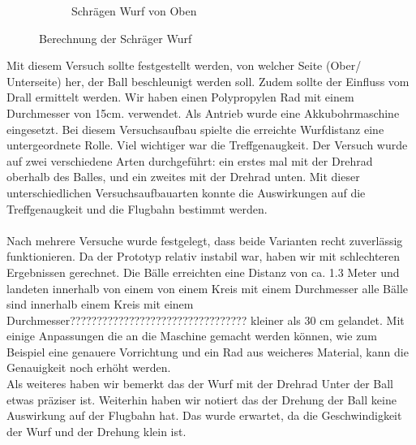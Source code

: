 \begin{figure}[h!]
\begin{subfigure}{.4\textwidth}
		\caption{Schrägen Wurf von Oben}
		\label{fig:Drehrad}
	\end{subfigure}
	\caption{Berechnung der Schräger Wurf}
	\label{Drehrad Versuch}
\end{figure}
Mit diesem Versuch sollte festgestellt werden, von welcher Seite (Ober/ Unterseite) her, der Ball beschleunigt werden soll. Zudem sollte der Einfluss vom Drall ermittelt werden. Wir haben einen Polypropylen Rad mit einem Durchmesser von 15cm. verwendet. Als Antrieb wurde eine Akkubohrmaschine eingesetzt. Bei diesem Versuchsaufbau spielte die erreichte Wurfdistanz eine untergeordnete Rolle. Viel wichtiger war die Treffgenaugkeit.  
Der Versuch wurde auf zwei verschiedene Arten durchgeführt: ein erstes mal mit der Drehrad oberhalb des Balles, und ein zweites mit der Drehrad unten. Mit dieser unterschiedlichen Versuchsaufbauarten konnte die Auswirkungen auf die Treffgenaugkeit und die Flugbahn bestimmt werden.\\ \\
Nach mehrere Versuche wurde festgelegt, dass beide Varianten recht zuverlässig funktionieren. Da der Prototyp relativ instabil war, haben wir mit schlechteren Ergebnissen gerechnet. Die Bälle erreichten eine Distanz von ca. 1.3 Meter und landeten innerhalb von einem von einem Kreis mit einem Durchmesser alle Bälle sind innerhalb einem Kreis mit einem Durchmesser????????????????????????????????? kleiner als 30 cm gelandet. Mit einige Anpassungen die an die Maschine gemacht werden können, wie zum Beispiel eine genauere Vorrichtung und ein Rad aus weicheres Material, kann die Genauigkeit noch erhöht werden.\\ Als weiteres haben wir bemerkt das der Wurf mit der Drehrad Unter der Ball etwas präziser ist. Weiterhin haben wir notiert das der Drehung der Ball keine Auswirkung auf der Flugbahn hat. Das wurde erwartet, da die Geschwindigkeit der Wurf und der Drehung klein ist. \\

